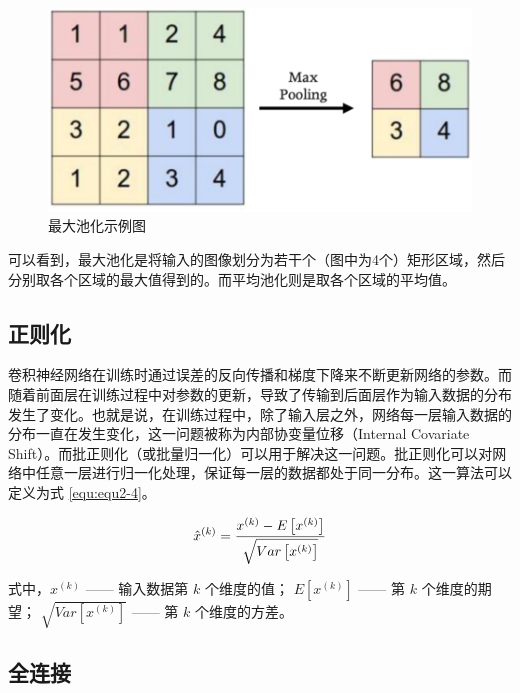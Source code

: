\begin{figure}[!htbp]
	\centering
	\includegraphics{figures/6.png}
	\caption{最大池化示例图}
	\label{fig:fig2-5}
\end{figure}

\newpage
可以看到，最大池化是将输入的图像划分为若干个（图中为4个）矩形区域，然后分别取各个区域的最大值得到的。而平均池化则是取各个区域的平均值。

\subsection{正则化}

卷积神经网络在训练时通过误差的反向传播和梯度下降来不断更新网络的参数。而随着前面层在训练过程中对参数的更新，导致了传输到后面层作为输入数据的分布发生了变化。也就是说，在训练过程中，除了输入层之外，网络每一层输入数据的分布一直在发生变化，这一问题被称为内部协变量位移（Internal Covariate Shift）。而批正则化（或批量归一化）可以用于解决这一问题。批正则化可以对网络中任意一层进行归一化处理，保证每一层的数据都处于同一分布。这一算法可以定义为式 \ref{equ:equ2-4}。

\vspace{0.5cm}
\begin{equation}
	{\hat{x}}^{\left(k\right)}=\frac{x^{\left(k\right)}-E\left[x^{\left(k\right)}\right]}{\sqrt{Var\left[x^{\left(k\right)}\right]}}
	\label{equ:equ2-4}
	\vspace{0.3cm}
\end{equation}

\noindent 式中，$x^{\left(k\right)}$ —— 输入数据第 $k$ 个维度的值；\newline
\indent\quad      $E\left[x^{\left(k\right)}\right]$ —— 第 $k$ 个维度的期望；\newline
\indent\quad       $\sqrt{Var\left[x^{\left(k\right)}\right]}$ —— 第 $k$ 个维度的方差。

\subsection{全连接}

